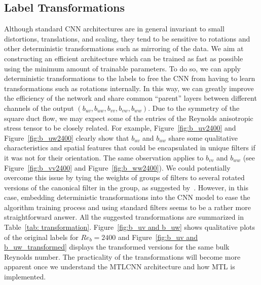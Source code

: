 \documentclass[11pt]{article}
\numberwithin{equation}{section}
\theoremstyle{plain}
\theoremstyle{definition}
\begin{document}
\subsection{Label Transformations}
\label{subsec: Label Transformations}
Although standard CNN architectures are in general invariant to small distortions, translations, and scaling, they tend to be sensitive to rotations and other deterministic transformations such as mirroring of the data. We aim at constructing an efficient architecture which can be trained as fast as possible using the minimum amount of trainable parameters. To do so, we can apply deterministic transformations to the labels to free the CNN from having to learn transformations such as rotations internally. In this way, we can greatly improve the efficiency of the network and share common ``parent'' layers between different channels of the output $\left(b_{uv},b_{uw},b_{vv},b_{vw},b_{ww}\right)$. Due to the symmetry of the square duct flow, we may expect some of the entries of the Reynolds anisotropic stress tensor to be closely related. For example, Figure~\ref{fig:b_uv2400} and Figure~\ref{fig:b_uw2400} clearly show that $b_{uv}$ and $b_{uw}$ share some qualitative characteristics and spatial features that could be encapsulated in unique filters if it was not for their orientation. The same observation applies to $b_{vv}$ and $b_{ww}$ (see Figure~\ref{fig:b_vv2400} and Figure~\ref{fig:b_ww2400}). We could potentially overcome this issue by tying the weights of groups of filters to several rotated versions of the canonical filter in the group, as suggested by~\cite{GonzalezVT16}. However, in this case, embedding deterministic transformations into the CNN model to ease the algorithm training process and using standard filters seems to be a rather more straightforward answer. All the suggested transformations are summarized in Table~\ref{tab: transformation}. Figure~\ref{fig:b_uv and b_uw} shows qualitative plots of the original labels for $Re_{b}=2400$ and Figure~\ref{fig:b_uv and b_uw_transformed} displays the transformed versions for the same bulk Reynolds number. The practicality of the transformations will become more apparent once we understand the MTLCNN architecture and how MTL is implemented.
\end{document}
